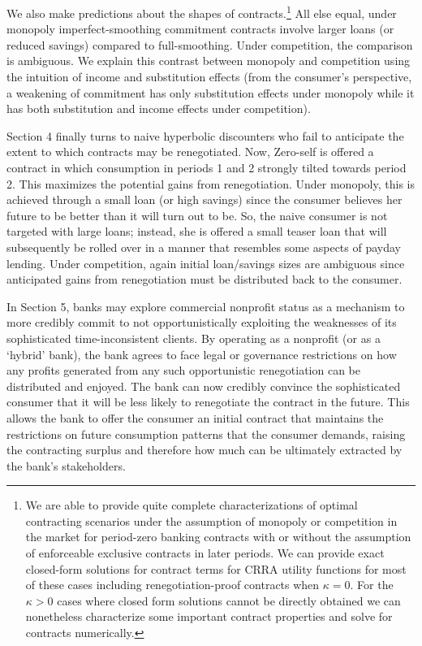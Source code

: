 \documentclass[11pt,english]{article}
\theoremstyle{plain}
\theoremstyle{definition}
\begin{document}
We also make predictions about the shapes of contracts.\footnote{We are able to provide quite complete characterizations of optimal
contracting scenarios under the assumption of monopoly or competition
in the market for period-zero banking contracts with or without the
assumption of enforceable exclusive contracts in later periods. We
can provide exact closed-form solutions for contract terms for CRRA
utility functions for most of these cases including renegotiation-proof
contracts when $\kappa=0$. For the $\kappa>0$ cases where closed
form solutions cannot be directly obtained we can nonetheless characterize
some important contract properties and solve for contracts numerically.} All else equal, under monopoly imperfect-smoothing commitment contracts
involve larger loans (or reduced savings) compared to full-smoothing.
Under competition, the comparison is ambiguous. We explain this contrast
between monopoly and competition using the intuition of income and
substitution effects (from the consumer's perspective, a weakening
of commitment has only substitution effects under monopoly while it
has both substitution and income effects under competition).

Section 4 finally turns to naive hyperbolic discounters who fail to
anticipate the extent to which contracts may be renegotiated. Now,
Zero-self is offered a contract in which consumption in periods 1
and 2 strongly tilted towards period 2. This maximizes the potential
gains from renegotiation. Under monopoly, this is achieved through
a small loan (or high savings) since the consumer believes her future
to be better than it will turn out to be. So, the naive consumer is
not targeted with large loans; instead, she is offered a small teaser
loan that will subsequently be rolled over in a manner that resembles
some aspects of payday lending. Under competition, again initial loan/savings
sizes are ambiguous since anticipated gains from renegotiation must
be distributed back to the consumer.

In Section 5, banks may explore commercial nonprofit status as a mechanism
to more credibly commit to not opportunistically exploiting the weaknesses
of its sophisticated time-inconsistent clients. By operating as a
nonprofit (or as a `hybrid' bank), the bank agrees to face legal or
governance restrictions on how any profits generated from any such
opportunistic renegotiation can be distributed and enjoyed. The bank
can now credibly convince the sophisticated consumer that it will
be less likely to renegotiate the contract in the future. This allows
the bank to offer the consumer an initial contract that maintains
the restrictions on future consumption patterns that the consumer
demands, raising the contracting surplus and therefore how much can
be ultimately extracted by the bank's stakeholders.
\end{document}
